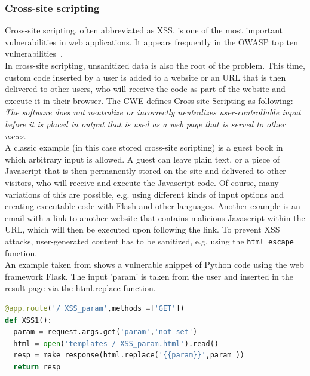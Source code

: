 \documentclass[
	a4paper,
	pagesize,
	pdftex,
	12pt,
	twoside, %
	BCOR=5mm, %
	ngerman,
	fleqn,
	final,
	]{scrartcl}
\begin{document}
\subsubsection{Cross-site scripting}
Cross-site scripting, often abbreviated as XSS, is one of the most important vulnerabilities in web applications. It appears frequently in the OWASP top ten vulnerabilities~\cite{OWASPFoundation.}.\\
In cross-site scripting, unsanitized data is also the root of the problem. This time, custom code inserted by a user is added to a website or an URL that is then delivered to other users, who will receive the code as part of the website and execute it in their browser. The CWE defines Cross-site Scripting as following: \textit{The software does not neutralize or incorrectly neutralizes user-controllable input before it is placed in output that is used as a web page that is served to other users.}~\cite{CommonWeaknessEnumeration.19.09.2019}\\
A classic example (in this case stored cross-site scripting) is a guest book in which arbitrary input is allowed. A guest can leave plain text, or a piece of Javascript that is then permanently stored on the site and delivered to other visitors, who will receive and execute the Javascript code. Of course, many variations of this are possible, e.g. using different kinds of input options and creating executable code with Flash and other languages. Another example is an email with a link to another website that contains malicious Javascript within the URL, which will then be executed upon following the link. 
To prevent XSS attacks, user-generated content has to be sanitized, e.g. using the \texttt{html\_escape} function.\\
An example taken from \cite{Micheelsen.2016} shows a vulnerable snippet of Python code using the web framework Flask. The input 'param' is taken from the user and inserted in the result page via the html.replace function.
\begin{lstlisting}[language=Python, showstringspaces=False]
@app.route('/ XSS_param',methods =['GET'])
def XSS1():
  param = request.args.get('param','not set')
  html = open('templates / XSS_param.html').read()
  resp = make_response(html.replace('{{param}}',param ))
  return resp
\end{lstlisting}
\end{document}

